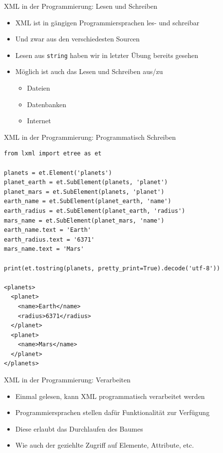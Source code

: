 \documentclass{beamer}
\begin{document}
\begin{frame}{XML in der Programmierung: Lesen und Schreiben}
	
	\begin{itemize}
		\item XML ist in gängigen Programmiersprachen les- und schreibar
		\item Und zwar aus den verschiedesten Sourcen
		\item Lesen aus \texttt{string} haben wir in letzter Übung bereits gesehen
		\item Möglich ist auch das Lesen und Schreiben aus/zu 
		\begin{itemize}
			\item Dateien
			\item Datenbanken
			\item Internet
		\end{itemize}
	\end{itemize}
	
\end{frame}

\begin{frame}[fragile]{XML in der Programmierung: Programmatisch Schreiben}
	
	\lstset{language=Python}
	\scriptsize
	\begin{lstlisting}
from lxml import etree as et

planets = et.Element('planets')
planet_earth = et.SubElement(planets, 'planet')
planet_mars = et.SubElement(planets, 'planet')
earth_name = et.SubElement(planet_earth, 'name')
earth_radius = et.SubElement(planet_earth, 'radius')
mars_name = et.SubElement(planet_mars, 'name')
earth_name.text = 'Earth'
earth_radius.text = '6371'
mars_name.text = 'Mars'

print(et.tostring(planets, pretty_print=True).decode('utf-8'))

<planets>
  <planet>
    <name>Earth</name>
    <radius>6371</radius>
  </planet>
  <planet>
    <name>Mars</name>
  </planet>
</planets>
	\end{lstlisting}
	
\end{frame}

\begin{frame}{XML in der Programmierung: Verarbeiten}
	
	\begin{itemize}
		\item Einmal gelesen, kann XML programmatisch verarbeitet werden
		\item Programmiersprachen stellen dafür Funktionalität zur Verfügung
		\item Diese erlaubt das Durchlaufen des Baumes
		\item Wie auch der geziehlte Zugriff auf Elemente, Attribute, etc.
	\end{itemize}
	
\end{frame}
\end{document}
